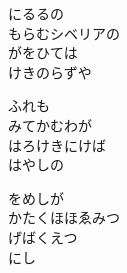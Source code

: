 \documentclass[10pt,b5j]{tarticle} %
\begin{document}
\begin{enumerate}
\begin{minipage}[c]{\blocksize}
        \vspace{\linespace}
        \item
        にるるの\\
        もらむシベリアの\\
        がをひては\\
        けきのらずや
        
        \vspace{\linespace}
        \item
        ふれも\\
        みてかむわが\\
        はろけきにけば\\
        はやしの
        
        \vspace{\linespace}
        \item
        をめしが\\
        かたくほほゑみつ\\
        げばくえつ\\
        にし
    
    \end{minipage}
\end{enumerate} %
\end{document}
